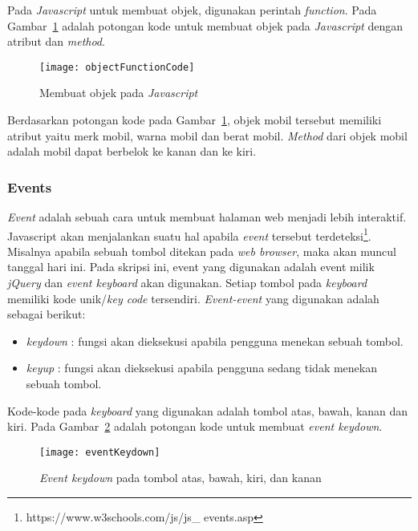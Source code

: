 Pada \textit{Javascript} untuk membuat objek, digunakan perintah \textit{function}. Pada Gambar~\ref{fig:objectFunctionCode} adalah potongan kode untuk membuat objek pada \textit{Javascript} dengan atribut dan \textit{method}.

\begin{figure}[H]
	\centering  
	\texttt{[image: objectFunctionCode]}
	\caption[Membuat objek pada \textit{Javascript}]{Membuat objek pada \textit{Javascript}}
	\label{fig:objectFunctionCode} 
\end{figure} 

Berdasarkan potongan kode pada Gambar~\ref{fig:objectFunctionCode}, objek mobil tersebut memiliki atribut yaitu merk mobil, warna mobil dan berat mobil. \textit{Method} dari objek mobil adalah mobil dapat berbelok ke kanan dan ke kiri.

\subsubsection{Events}
\textit{Event} adalah sebuah cara untuk membuat halaman web menjadi lebih interaktif. Javascript akan menjalankan suatu hal apabila \textit{event} tersebut terdeteksi\footnote{https://www.w3schools.com/js/js\_ events.asp}. Misalnya apabila sebuah tombol ditekan pada \textit{web browser}, maka akan muncul tanggal hari ini.  Pada skripsi ini, event yang digunakan adalah event milik \textit{jQuery} dan \textit{event keyboard} akan digunakan. Setiap tombol pada \textit{keyboard} memiliki kode unik/\textit{key code} tersendiri. \textit{Event-event} yang digunakan adalah sebagai berikut:

\begin{itemize}
	\item \textit{keydown} : fungsi akan dieksekusi apabila pengguna menekan sebuah tombol.
	\item \textit{keyup} : fungsi akan dieksekusi apabila pengguna sedang tidak menekan sebuah tombol.
\end{itemize}

Kode-kode pada \textit{keyboard} yang digunakan adalah tombol atas, bawah, kanan dan kiri. Pada Gambar~\ref{fig:eventKeyDown} adalah potongan kode untuk membuat \textit{event keydown}.

\begin{figure}[H]
	\centering  
	\texttt{[image: eventKeydown]}
	\caption[\textit{Event keydown} pada tombol atas, bawah, kiri, dan kanan]{\textit{Event keydown} pada tombol atas, bawah, kiri, dan kanan}
	\label{fig:eventKeyDown} 
\end{figure} 

